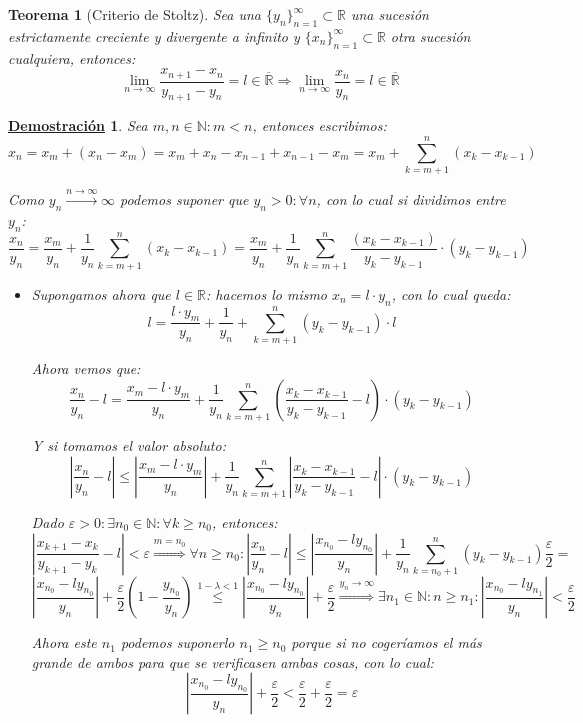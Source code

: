 \documentclass[10pt,a4paper,openright]{book}
\theoremstyle{break}
\newtheorem{theo}{Teorema}[chapter]
\newtheorem*{demo}{\underline{Demostración}}
\begin{document}
\begin{theo}[Criterio de Stoltz]
Sea una $\{y_n\}_{n=1}^\infty\subset \mathbb R$ una sucesión estrictamente creciente y divergente a infinito y $\{x_n\}_{n=1}^\infty\subset \mathbb R$ otra sucesión cualquiera, entonces:
$$\lim_{n\rightarrow \infty} \frac{x_{n+1}-x_n}{y_{n+1}-y_n}=l\in \overline{\mathbb R}\Rightarrow \lim_{n\rightarrow \infty} \frac{x_n}{y_n}=l\in \overline{\mathbb R}$$
\end{theo}
\begin{demo}
Sea $m,n\in \mathbb N: m<n$, entonces escribimos:
$$x_n=x_m+(x_n-x_m)=x_m+x_n-x_{n-1}+x_{n-1}-x_m=x_m+\sum_{k=m+1}^n (x_k-x_{k-1})$$

Como $y_n\stackrel{n\rightarrow\infty}{\rightarrow} \infty$ podemos suponer que $y_n>0: \forall n$, con lo cual si dividimos entre $y_n$:
$$\frac{x_n}{y_n}=\frac{x_m}{y_n}+\frac{1}{y_n}\sum_{k=m+1}^n (x_k-x_{k-1})=\frac{x_m}{y_n}+\frac{1}{y_n}\sum_{k=m+1}^n \frac{(x_k-x_{k-1})}{y_k-y_{k-1}}\cdot (y_k-y_{k-1})$$

\begin{itemize}
\item Supongamos ahora que $l\in \mathbb R$: hacemos lo mismo $x_n=l\cdot y_n$, con lo cual queda:
$$l=\frac{l\cdot y_m}{y_n}+\frac{1}{y_n}+\sum_{k=m+1}^n (y_k-y_{k-1})\cdot l$$

Ahora vemos que:
$$\frac{x_n}{y_n}-l=\frac{x_m-l\cdot y_m}{y_n}+\frac{1}{y_n}\sum_{k=m+1}^n \left(\frac{x_k-x_{k-1}}{y_k-y_{k-1}}-l\right)\cdot (y_k-y_{k-1})$$

Y si tomamos el valor absoluto:
$$\left|\frac{x_n}{y_n}-l\right|\leq \left|\frac{x_m-l\cdot y_m}{y_n}\right|+\frac{1}{y_n}\sum_{k=m+1}^n \left|\frac{x_k-x_{k-1}}{y_k-y_{k-1}}-l\right|\cdot (y_k-y_{k-1})$$

Dado $\varepsilon>0: \exists n_0\in \mathbb N: \forall k\geq n_0$, entonces:
$$\left|\frac{x_{k+1}-x_k}{y_{k+1}-y_k}-l\right|<\varepsilon\stackrel{m=n_0}{\Rightarrow} \forall n\geq n_0: \left|\frac{x_n}{y_n}-l\right|\leq \left|\frac{x_{n_0}-ly_{n_0}}{y_n}\right|+\frac{1}{y_n}\sum_{k=n_0+1}^n (y_k-y_{k-1})\frac{\varepsilon}{2}=$$
$$\left|\frac{x_{n_0}-ly_{n_0}}{y_n}\right|+\frac{\varepsilon}{2}\left(1-\frac{y_{n_0}}{y_n}\right)\stackrel{1-\lambda<1}{\leq} \left|\frac{x_{n_0}-ly_{n_0}}{y_n}\right|+\frac{\varepsilon}{2}\stackrel{y_n\rightarrow\infty}{\Rightarrow} \exists n_1\in \mathbb N: n\geq n_1: \left|\frac{x_{n_0}-ly_{n_1}}{y_n}\right|<\frac{\varepsilon}{2}$$

Ahora este $n_1$ podemos suponerlo $n_1\geq n_0$ porque si no cogeríamos el más grande de ambos para que se verificasen ambas cosas, con lo cual:
$$\left|\frac{x_{n_0}-ly_{n_0}}{y_n}\right|+\frac{\varepsilon}{2}<\frac{\varepsilon}{2}+\frac{\varepsilon}{2}=\varepsilon $$


\end{itemize}
\end{demo}
\end{document}
